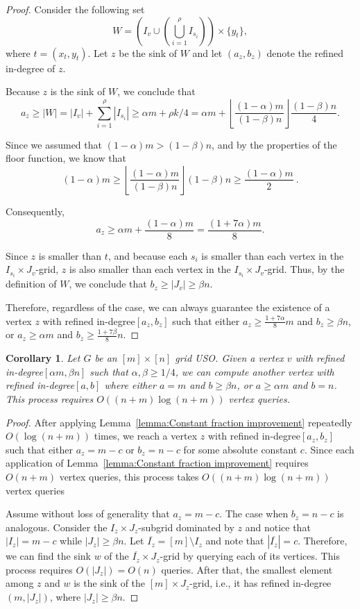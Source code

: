 \documentclass[a4paper,10pt]{article}
\newtheorem{corollary}{Corollary}
\newcommand{\indegree}{refined in-degree\xspace}
\begin{document}
\begin{proof}
Consider the following set $$W = \left(I_v\cup \left(\bigcup_{i=1}^\rho I_{s_i}\right)\right)\times \{y_t\},$$
where $t = (x_t, y_t)$.
Let $z$ be the sink of $W$ and let $(a_z, b_z)$ denote the \indegree of $z$.

Because $z$ is the sink of $W$, we conclude that 
$$a_z \geq |W|  = |I_v| + \sum_{i=1}^\rho |I_{s_i}| \geq
\alpha m + \rho k/4  = \alpha m +  \left\lfloor \frac{(1-\alpha)m}{(1-\beta)n} \right\rfloor \frac{(1-\beta) n}{4}.$$

Since we assumed that $(1 - \alpha) m > (1-\beta) n$, and by the properties of the floor function, we know that $$(1 - \alpha) m \geq \left \lfloor \frac{(1-\alpha)m}{(1-\beta)n} \right \rfloor (1-\beta)n \geq \frac{(1 - \alpha) m}{2} \ .$$

Consequently, 
$$a_z \geq \alpha m + \frac{(1-\alpha)m}{8} = \frac{(1 + 7\alpha) m}{8}.$$

Since $z$ is smaller than $t$, and 
because each $s_i$ is smaller than each vertex in the $I_{s_i}\times J_v$-grid, $z$ is also smaller than each vertex in the $I_{s_i}\times J_v$-grid. Thus, by the definition of $W$, we conclude that $b_z \geq |J_v| \geq \beta n$.

Therefore, regardless of the case, we can always guarantee the existence of a vertex $z$ with \indegree $[a_z,b_z]$ such that either $a_z\geq \frac{1+7\alpha}{8}m$ and $b_z \geq \beta n$, or $a_z \geq \alpha m$ and $b_z \geq \frac{1 + 7\beta}{8}n$.
\end{proof}

\begin{corollary}
Let $G$ be an $[m]\times[n]$ grid USO. 
Given a vertex $v$ with \indegree $[\alpha m, \beta n]$ such that $\alpha, \beta \geq 1/4$, we can compute another vertex with \indegree $[a,b]$ where either $a = m$ and $b \geq \beta n$, or $a \geq \alpha m$ and $b  = n$. This process requires $O((n + m) \log (n+m))$ vertex queries.
\end{corollary}
\begin{proof}
After applying Lemma~\ref{lemma:Constant fraction improvement} repeatedly $O(\log(n + m))$ times, we reach a vertex $z$ with \indegree $[a_z, b_z]$ such that either $a_z = m - c$ or $b_z = n- c$ for some absolute constant $c$. 
Since each application of Lemma~\ref{lemma:Constant fraction improvement} requires $O(n+m)$ vertex queries, this process takes $O((n + m) \log (n+m))$ vertex queries

Assume without loss of generality that $a_z = m-c$. The case when $b_z = n-c$ is analogous. 
Consider the  $I_z\times J_z$-subgrid dominated by $z$ and 
notice that $|I_z| = m-c$ while $|J_z| \geq \beta n$. 
Let $\overline{I_z} = [m] \setminus I_z$ and note that $|\overline{I_z}| = c$. Therefore, we can find the sink $w$ of the $\overline{I_z}\times J_z$-grid by querying each of its vertices. This process requires $O(|J_z|) = O(n)$ queries.  After that, the smallest element among $z$ and $w$ is the sink of the $[m]\times J_z$-grid, i.e., it has \indegree $(m, |J_z|)$, where $|J_z|  \geq \beta n$.
\end{proof}







\end{document}
